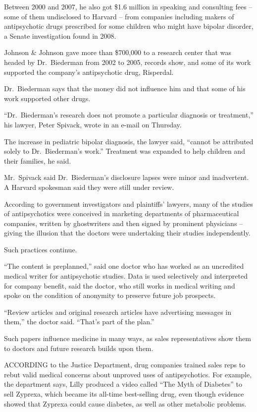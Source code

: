 ﻿\documentclass[12pt]{article}
\begin{document}
Between 2000 and 2007, he also got \$1.6 million in speaking and consulting fees -- some of them
undisclosed to Harvard -- from companies including makers of antipsychotic drugs prescribed for some
children who might have bipolar disorder, a Senate investigation found in 2008.

Johnson \& Johnson gave more than \$700,000 to a research center that was headed by Dr.~Biederman
from 2002 to 2005, records show, and some of its work supported the company's antipsychotic drug,
Risperdal.

Dr.~Biederman says that the money did not influence him and that some of his work supported other
drugs.

``Dr.~Biederman's research does not promote a particular diagnosis or treatment,'' his lawyer, Peter
Spivack, wrote in an e-mail on Thursday.

The increase in pediatric bipolar diagnosis, the lawyer said, ``cannot be attributed solely to
Dr.~Biederman's work.'' Treatment was expanded to help children and their families, he said.

Mr.~Spivack said Dr.~Biederman's disclosure lapses were minor and inadvertent. A Harvard spokesman
said they were still under review.

According to government investigators and plaintiffs' lawyers, many of the studies of antipsychotics
were conceived in marketing departments of pharmaceutical companies, written by ghostwriters and
then signed by prominent physicians -- giving the illusion that the doctors were undertaking their
studies independently.

Such practices continue.

``The content is preplanned,'' said one doctor who has worked as an uncredited medical writer for
antipsychotic studies. Data is used selectively and interpreted for company benefit, said the
doctor, who still works in medical writing and spoke on the condition of anonymity to preserve
future job prospects.

``Review articles and original research articles have advertising messages in them,'' the doctor
said. ``That's part of the plan.''

Such papers influence medicine in many ways, as sales representatives show them to doctors and
future research builds upon them.

ACCORDING to the Justice Department, drug companies trained sales reps to rebut valid medical
concerns about unproved uses of antipsychotics. For example, the department says, Lilly produced a
video called ``The Myth of Diabetes'' to sell Zyprexa, which became its all-time best-selling drug,
even though evidence showed that Zyprexa could cause diabetes, as well as other metabolic problems.
\end{document}
